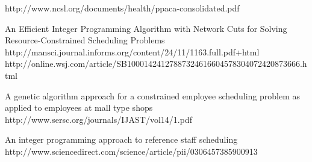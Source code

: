\begin{thebibliography}{99} %


 http://www.ncsl.org/documents/health/ppaca-consolidated.pdf

 An Efficient Integer Programming Algorithm with Network Cuts for Solving Resource-Constrained Scheduling Problems http://mansci.journal.informs.org/content/24/11/1163.full.pdf+html
   http://online.wsj.com/article/SB10001424127887324616604578304072420873666.html



A genetic algorithm approach for a constrained employee scheduling problem as applied to employees at mall type shops http://www.sersc.org/journals/IJAST/vol14/1.pdf

 An integer programming approach to reference staff scheduling http://www.sciencedirect.com/science/article/pii/0306457385900913

\end{thebibliography}